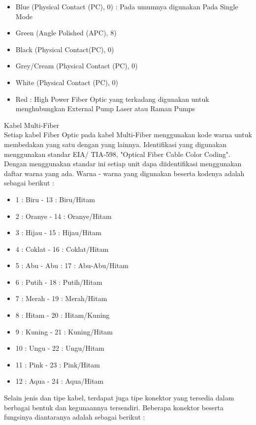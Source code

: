\begin{flushleft}
\begin{itemize}
	\begin{itemize}
		\item Blue (Physical Contact (PC), 0) : Pada umumnya digunakan Pada Single Mode
		\item Green (Angle Polished (APC), 8)
		\item Black (Physical Contact(PC), 0)
		\item Grey/Cream (Physical Contact (PC), 0)
		\item White (Physical Contact (PC), 0)
		\item Red : High Power Fiber Optic yang terkadang digunakan untuk menghubungkan External Pump Laser atau Raman Pumps
	\end{itemize}
\end{itemize}
\item Kabel Multi-Fiber \\ Setiap kabel Fiber Optic pada kabel Multi-Fiber menggunakan kode warna untuk membedakan yang satu dengan yang lainnya. Identifikasi yang digunakan menggunakan standar EIA/ TIA-598, "Optical Fiber Cable Color Coding". Dengan menggunakan standar ini setiap unit dapa diidentifikasi menggunakan daftar warna yang ada. Warna - warna yang digunakan beserta kodenya adalah sebagai berikut : \\
\begin{itemize}
\item 1 : Biru - 13 : Biru/Hitam
\item 2 : Oranye - 14 : Oranye/Hitam 
\item 3 : Hijau - 15 : Hijau/Hitam 
\item 4 : Coklat - 16 : Coklat/Hitam 
\item 5 : Abu - Abu : 17 : Abu-Abu/Hitam 
\item 6 : Putih - 18 : Putih/Hitam 
\item 7 : Merah - 19 : Merah/Hitam 
\item 8 : Hitam - 20 : Hitam/Kuning 
\item 9 : Kuning - 21 : Kuning/Hitam 
\item 10 : Ungu - 22 : Ungu/Hitam 
\item 11 : Pink - 23 : Pink/Hitam 
\item 12 : Aqua - 24 : Aqua/Hitam 
\end{itemize}
Selain jenis dan tipe kabel, terdapat juga tipe konektor yang tersedia dalam berbagai bentuk dan kegunaannya tersendiri. Beberapa konektor beserta fungsinya diantaranya adalah sebagai berikut : \\
\begin{enumerate}

\end{enumerate}
\end{flushleft}
